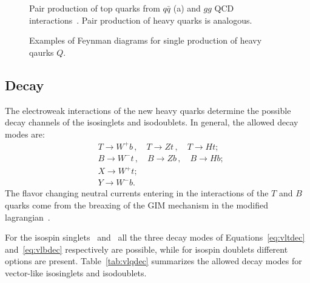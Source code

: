 \begin{figure}[htb]\begin{center}
	\caption{Pair production of top quarks from $q\bar{q}$ (a) 
          and $gg$ QCD interactions~\cite{Kidonakis:2011ca}. Pair
          production of heavy quarks is analogous.\label{fig:ttprod}}
\myskip
        
        \caption{Examples of Feynman diagrams for single production of heavy qaurks $Q$.\label{fig:singleprod}}
\end{center}\end{figure}


\subsection{Decay}\label{sec:vlqdecay}

The electroweak interactions of the new heavy
quarks determine the possible decay channels of
the isosinglets and isodoublets.
In general, the allowed decay modes are:
\begin{align}
& T \to W^+ b \,, \quad T \to Zt \,,\quad T \to Ht;\label{eq:vltdec}\\
& B \to W^- t \,, \quad B \to Zb \,,\quad B \to Hb;\label{eq:vlbdec}\\
& X \to W^+ t;\\
& Y \to W^- b.
\end{align}
The flavor changing neutral currents entering in the
interactions of the $T$ and $B$ quarks come from the
breaxing of the GIM mechanism in the modified 
lagrangian~\cite{AguilarSaavedra:2009es}.

For the isospin singlets \Tlr\ and \Blr\ all the 
three decay modes of Equations~\ref{eq:vltdec} and~\ref{eq:vlbdec}
respectively are possible, while for isospin doublets different
options are present. Table~\ref{tab:vlqdec} summarizes the
allowed  decay modes for vector-like isosinglets and isodoublets.


